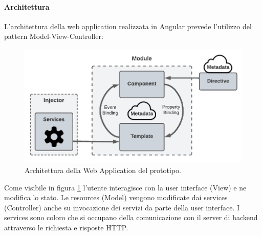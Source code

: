 \paragraph{Architettura}
L'architettura della web application realizzata in Angular prevede l'utilizzo del pattern Model-View-Controller:
\FloatBarrier
\begin{figure}[!ht]
\centering
\includegraphics[width=1\linewidth]{immagini/angularArchitecture.pdf}
\caption{Architettura della Web Application del prototipo.}
\label{angular-architecture}
\end{figure}
\FloatBarrier
Come visibile in figura \ref{angular-architecture} l'utente interagisce con la user interface (View) e ne modifica lo stato. Le resources (Model) vengono modificate dai services (Controller) anche su invocazione dei servizi da parte della user interface. I services sono coloro che si occupano della comunicazione con il server di backend attraverso le richiesta e risposte HTTP.
